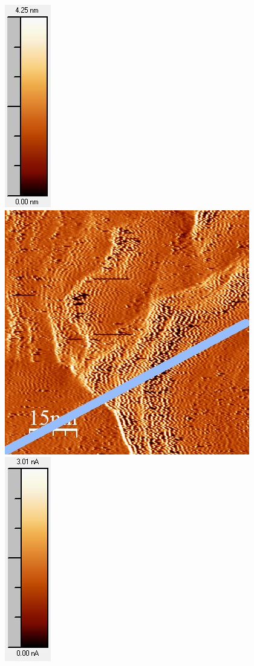 \documentclass[12pt,a4paper]{article}
\begin{document}
\begin{figure}[H]
\includegraphics[scale=0.6]{Bilder/Anhang/Zeit/0_052_Zeit_nach_Skala.jpg}
\includegraphics[scale=0.6]{Bilder/Anhang/Zeit/Strom/0_052_Zeit_vor_Strom.jpg}
\includegraphics[scale=0.6]{Bilder/Anhang/Zeit/Strom/0_052_Zeit_vor_Strom_Skala.jpg}

\end{figure}
\end{document}
